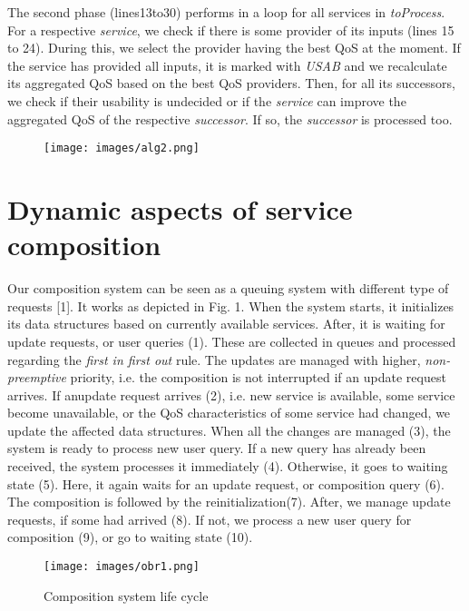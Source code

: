 \documentclass[10pt]{llncs}
\begin{document}
The second phase (lines13to30) performs in a loop for all services in \textit{toProcess}. For a respective \textit{service}, we check if there is some provider of its inputs (lines 15 to 24). During this, we select the provider having the best QoS at the moment. If the service has provided all inputs, it is marked with \textit{USAB} and we recalculate its aggregated QoS based on the best QoS providers. Then, for all its successors, we check if their usability is undecided or if the \textit{service} can improve the aggregated QoS of the respective \textit{successor}. If so, the \textit{successor} is processed too.

\begin{figure}[h]
\texttt{[image: images/alg2.png]}
\end{figure}


\section{ Dynamic aspects of service composition
}

Our composition system can be seen as a queuing system with different type of requests [1]. It works as depicted in Fig. 1. When the system starts, it initializes its data structures based on currently available services. After, it is waiting for update requests, or user queries (1). These are collected in queues and processed regarding the \textit{ﬁrst in ﬁrst out} rule. The updates are managed with higher, \textit{non-preemptive} priority, i.e. the composition is not interrupted if an update request arrives. If anupdate request arrives (2), i.e. new service is available, some service become unavailable, or the QoS characteristics of some service had changed, we update the affected data structures. When all the changes are managed (3), the system is ready to process new user query. If a new query has already been received, the system processes it immediately (4). Otherwise, it goes to waiting state (5). Here, it again waits for an update request, or composition query (6). The composition is followed by the reinitialization(7). After, we manage update requests, if some had arrived (8). If not, we process a new user query for composition (9), or go to waiting state (10).


\begin{figure}[h]
\texttt{[image: images/obr1.png]}
\caption{Composition system life cycle}
\end{figure}
\end{document}
